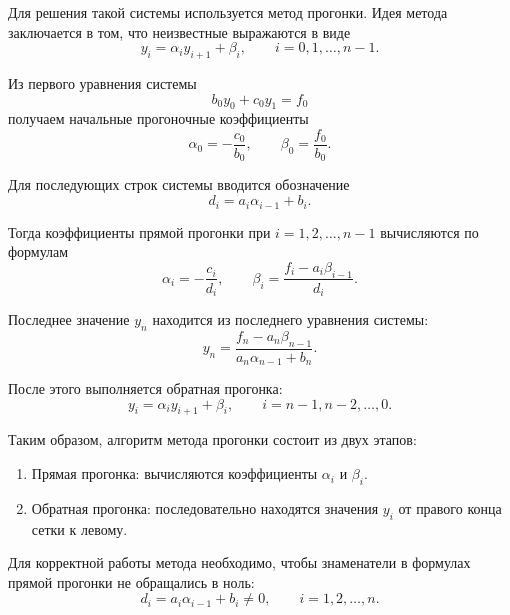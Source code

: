 \documentclass[12pt,a4paper]{article}
\begin{document}
Для решения такой системы используется метод прогонки. Идея метода заключается в том, что неизвестные выражаются в виде
\begin{equation*}
    y_i = \alpha_i y_{i+1} + \beta_i,
    \qquad i = 0,1,\ldots,n-1.
\end{equation*}

Из первого уравнения системы
\begin{equation*}
    b_0 y_0 + c_0 y_1 = f_0
\end{equation*}
получаем начальные прогоночные коэффициенты
\begin{equation*}
    \alpha_0 = -\frac{c_0}{b_0},
    \qquad
    \beta_0 = \frac{f_0}{b_0}.
\end{equation*}

Для последующих строк системы вводится обозначение
\begin{equation*}
    d_i = a_i \alpha_{i-1} + b_i.
\end{equation*}

Тогда коэффициенты прямой прогонки при $i = 1,2,\ldots,n-1$ вычисляются по формулам
\begin{equation*}
    \alpha_i = -\frac{c_i}{d_i},
    \qquad
    \beta_i = \frac{f_i - a_i \beta_{i-1}}{d_i}.
\end{equation*}

Последнее значение $y_n$ находится из последнего уравнения системы:
\begin{equation*}
    y_n =
    \frac{f_n - a_n \beta_{n-1}}
    {a_n \alpha_{n-1} + b_n}.
\end{equation*}

После этого выполняется обратная прогонка:
\begin{equation*}
    y_i = \alpha_i y_{i+1} + \beta_i,
    \qquad i = n-1,n-2,\ldots,0.
\end{equation*}

Таким образом, алгоритм метода прогонки состоит из двух этапов:
\begin{enumerate}
    \item Прямая прогонка: вычисляются коэффициенты $\alpha_i$ и $\beta_i$.
    \item Обратная прогонка: последовательно находятся значения $y_i$ от правого конца сетки к левому.
\end{enumerate}

Для корректной работы метода необходимо, чтобы знаменатели в формулах прямой прогонки не обращались в ноль:
\begin{equation*}
    d_i = a_i \alpha_{i-1} + b_i \neq 0,
    \qquad i = 1,2,\ldots,n.
\end{equation*}
\end{document}
